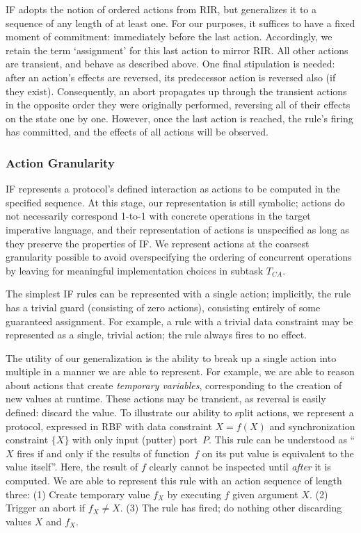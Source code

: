 IF adopts the notion of ordered actions from RIR, but generalizes it to a sequence of any length of at least one. For our purposes, it suffices to have a fixed moment of commitment: immediately before the last action. Accordingly, we retain the term `assignment' for this last action to mirror RIR. All other actions are transient, and behave as described above. One final stipulation is needed: after an action's effects are reversed, its predecessor action is reversed also (if they exist). Consequently, an abort propagates up through the transient actions in the opposite order they were originally performed, reversing all of their effects on the state one by one. However, once the last action is reached, the rule's firing has committed, and the effects of all actions will be observed.

\subsubsection{Action Granularity}
IF represents a protocol's defined interaction as actions to be computed in the specified sequence. At this stage, our representation is still symbolic; actions do not necessarily correspond 1-to-1 with concrete operations in the target imperative language, and their representation of actions is unspecified as long as they preserve the properties of IF. We represent actions at the coarsest granularity possible to avoid overspecifying the ordering of concurrent operations by leaving for meaningful implementation choices in subtask $T_{CA}$.

The simplest IF rules can be represented with a single action; implicitly, the rule has a trivial guard (consisting of zero actions), consisting entirely of some guaranteed assignment. For example, a rule with a trivial data constraint may be represented as a single, trivial action; the rule always fires to no effect.

The utility of our generalization is the ability to break up a single action into multiple in a manner we are able to represent. For example, we are able to reason about actions that create \textit{temporary variables}, corresponding to the creation of new values at runtime. These actions may be transient, as reversal is easily defined: discard the value. To illustrate our ability to split actions, we represent a protocol, expressed in RBF with data constraint $X=f(X)$ and synchronization constraint $\{X\}$ with only input (putter) port~$P$. This rule can be understood as ``$X$ fires if and only if the results of function~$f$ on its put value is equivalent to the value itself''. Here, the result of $f$ clearly cannot be inspected until \textit{after} it is computed. We are able to represent this rule with an action sequence of length three: (1) Create temporary value $f_X$ by executing $f$ given argument $X$. (2) Trigger an abort if $f_X\neq{}X$. (3) The rule has fired; do nothing other discarding values $X$ and $f_X$. 


